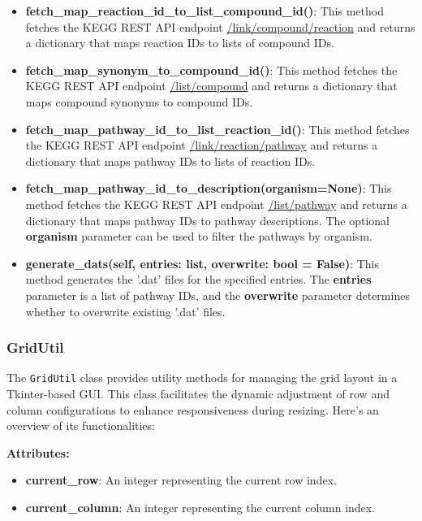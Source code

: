 \begin{itemize}
    \item \textbf{fetch\_map\_reaction\_id\_to\_list\_compound\_id()}: This method fetches the KEGG REST API endpoint \href{https://rest.kegg.jp/link/compound/reaction}{/link/compound/reaction} and returns a dictionary that maps reaction IDs to lists of compound IDs.
    \item \textbf{fetch\_map\_synonym\_to\_compound\_id()}: This method fetches the KEGG REST API endpoint \href{https://rest.kegg.jp/list/compound}{/list/compound} and returns a dictionary that maps compound synonyms to compound IDs.
    \item \textbf{fetch\_map\_pathway\_id\_to\_list\_reaction\_id()}: This method fetches the KEGG REST API endpoint \href{https://rest.kegg.jp/link/reaction/pathway}{/link/reaction/pathway} and returns a dictionary that maps pathway IDs to lists of reaction IDs. 
    \item \textbf{fetch\_map\_pathway\_id\_to\_description(organism=None)}: This method fetches the KEGG REST API endpoint \href{https://rest.kegg.jp/list/pathway}{/list/pathway} and returns a dictionary that maps pathway IDs to pathway descriptions. The optional \textbf{organism} parameter can be used to filter the pathways by organism.
    \item \textbf{generate\_dats(self, entries: list, overwrite: bool = False)}: This method generates the '.dat' files for the specified entries. The \textbf{entries} parameter is a list of pathway IDs, and the \textbf{overwrite} parameter determines whether to overwrite existing '.dat' files.
\end{itemize}


\subsubsection{GridUtil}

The \texttt{GridUtil} class provides utility methods for managing the grid layout in a Tkinter-based GUI. This class facilitates the dynamic adjustment of row and column configurations to enhance responsiveness during resizing. Here's an overview of its functionalities:

\textbf{Attributes:}

\begin{itemize}
\item \textbf{current\_row}: An integer representing the current row index.
\item \textbf{current\_column}: An integer representing the current column index.
\end{itemize}

